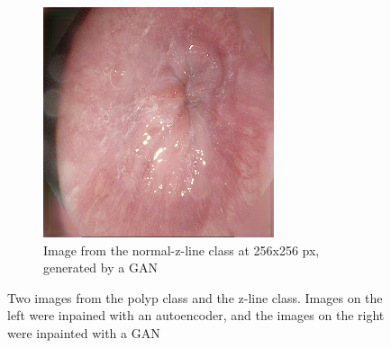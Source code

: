 \begin{figure}[t]
\begin{subfigure}[b]{0.4\textwidth}
            \includegraphics[width=\textwidth]{experiments/figures/blackcorner/zGAN.jpg}
            \caption[]%
            {{\small Image from the normal-z-line class at 256x256 px, generated by a GAN }}    
            \label{fig:zGANBLACK}
        \end{subfigure}
        \caption[ ]
        {\small Two images from the polyp class and the z-line class. Images on the left were inpained with an autoencoder, and the images on the right were inpainted with a GAN} 
        \label{fig:BC1BLACK}
    \end{figure}
    
